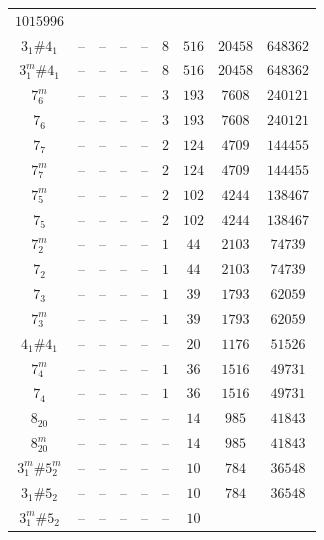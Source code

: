\documentclass[amsmath,secnumarabic,amssymb,floatfix,nofootinbib,nobibnotes,letterpaper,11pt,tightenlines,showkeys]{revtex4}
\theoremstyle{definition}
\begin{document}
\begin{table}[H]
\begin{ruledtabular}
\begin{tabular}{ccccccccc}
$\num{1015996}$\\
$3_{1}^{}\#4_{1}^{}$ &
-- &
-- &
-- &
-- &
$\num{8}$ &
$\num{516}$ &
$\num{20458}$ &
$\num{648362}$\\
$3_{1}^{m}\#4_{1}^{}$ &
-- &
-- &
-- &
-- &
$\num{8}$ &
$\num{516}$ &
$\num{20458}$ &
$\num{648362}$\\
$7_{6}^{m}$ &
-- &
-- &
-- &
-- &
$\num{3}$ &
$\num{193}$ &
$\num{7608}$ &
$\num{240121}$\\
$7_{6}^{}$ &
-- &
-- &
-- &
-- &
$\num{3}$ &
$\num{193}$ &
$\num{7608}$ &
$\num{240121}$\\
$7_{7}^{}$ &
-- &
-- &
-- &
-- &
$\num{2}$ &
$\num{124}$ &
$\num{4709}$ &
$\num{144455}$\\
$7_{7}^{m}$ &
-- &
-- &
-- &
-- &
$\num{2}$ &
$\num{124}$ &
$\num{4709}$ &
$\num{144455}$\\
$7_{5}^{m}$ &
-- &
-- &
-- &
-- &
$\num{2}$ &
$\num{102}$ &
$\num{4244}$ &
$\num{138467}$\\
$7_{5}^{}$ &
-- &
-- &
-- &
-- &
$\num{2}$ &
$\num{102}$ &
$\num{4244}$ &
$\num{138467}$\\
$7_{2}^{m}$ &
-- &
-- &
-- &
-- &
$\num{1}$ &
$\num{44}$ &
$\num{2103}$ &
$\num{74739}$\\
$7_{2}^{}$ &
-- &
-- &
-- &
-- &
$\num{1}$ &
$\num{44}$ &
$\num{2103}$ &
$\num{74739}$\\
$7_{3}^{}$ &
-- &
-- &
-- &
-- &
$\num{1}$ &
$\num{39}$ &
$\num{1793}$ &
$\num{62059}$\\
$7_{3}^{m}$ &
-- &
-- &
-- &
-- &
$\num{1}$ &
$\num{39}$ &
$\num{1793}$ &
$\num{62059}$\\
$4_{1}^{}\#4_{1}^{}$ &
-- &
-- &
-- &
-- &
-- &
$\num{20}$ &
$\num{1176}$ &
$\num{51526}$\\
$7_{4}^{m}$ &
-- &
-- &
-- &
-- &
$\num{1}$ &
$\num{36}$ &
$\num{1516}$ &
$\num{49731}$\\
$7_{4}^{}$ &
-- &
-- &
-- &
-- &
$\num{1}$ &
$\num{36}$ &
$\num{1516}$ &
$\num{49731}$\\
$8_{20}^{}$ &
-- &
-- &
-- &
-- &
-- &
$\num{14}$ &
$\num{985}$ &
$\num{41843}$\\
$8_{20}^{m}$ &
-- &
-- &
-- &
-- &
-- &
$\num{14}$ &
$\num{985}$ &
$\num{41843}$\\
$3_{1}^{m}\#5_{2}^{m}$ &
-- &
-- &
-- &
-- &
-- &
$\num{10}$ &
$\num{784}$ &
$\num{36548}$\\
$3_{1}^{}\#5_{2}^{}$ &
-- &
-- &
-- &
-- &
-- &
$\num{10}$ &
$\num{784}$ &
$\num{36548}$\\
$3_{1}^{m}\#5_{2}^{}$ &
-- &
-- &
-- &
-- &
-- &
$\num{10}$ &

\end{tabular}
\end{ruledtabular}
\end{table}
\end{document}
